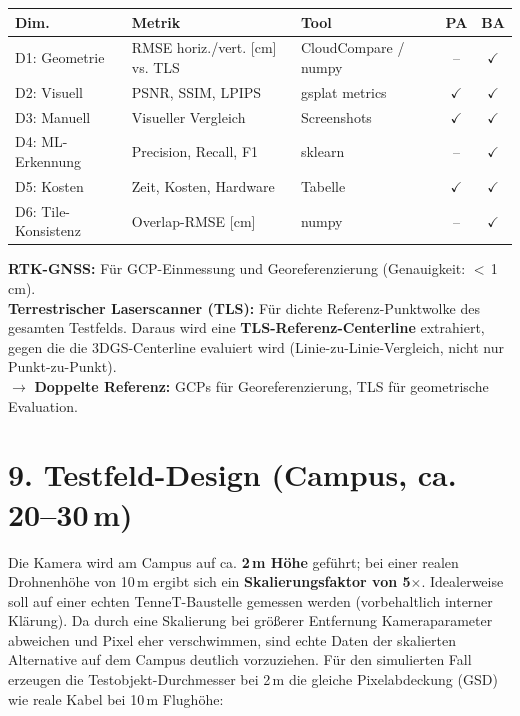 \documentclass[11pt, a4paper]{article}
\begin{document}
\begin{center}
\small
\begin{tabular}{|p{2cm}|p{4cm}|p{3cm}|c|c|}
\hline
\textbf{Dim.} & \textbf{Metrik} & \textbf{Tool} & \textbf{PA} & \textbf{BA} \\
\hline
D1: Geometrie & RMSE horiz./vert. [cm] vs. TLS & CloudCompare / numpy & -- & $\checkmark$ \\
\hline
D2: Visuell & PSNR, SSIM, LPIPS & gsplat metrics & $\checkmark$ & $\checkmark$ \\
\hline
D3: Manuell & Visueller Vergleich & Screenshots & $\checkmark$ & $\checkmark$ \\
\hline
D4: ML-Erkennung & Precision, Recall, F1 & sklearn & -- & $\checkmark$ \\
\hline
D5: Kosten & Zeit, Kosten, Hardware & Tabelle & $\checkmark$ & $\checkmark$ \\
\hline
D6: Tile-Konsistenz & Overlap-RMSE [cm] & numpy & -- & $\checkmark$ \\
\hline
\end{tabular}
\end{center}

\begin{tcolorbox}[colback=green!5, colframe=green!50!black, title=\textbf{Referenzdaten (verf\"ugbar an der Hochschule)}]
\textbf{RTK-GNSS:} F\"ur GCP-Einmessung und Georeferenzierung (Genauigkeit: $<$\,1\,cm).\\
\textbf{Terrestrischer Laserscanner (TLS):} F\"ur dichte Referenz-Punktwolke des gesamten Testfelds. Daraus wird eine \textbf{TLS-Referenz-Centerline} extrahiert, gegen die die 3DGS-Centerline evaluiert wird (Linie-zu-Linie-Vergleich, nicht nur Punkt-zu-Punkt).\\
$\rightarrow$ \textbf{Doppelte Referenz:} GCPs f\"ur Georeferenzierung, TLS f\"ur geometrische Evaluation.
\end{tcolorbox}

\section{9. Testfeld-Design (Campus, ca. 20--30\,m)}

Die Kamera wird am Campus auf ca. \textbf{2\,m H\"ohe} gef\"uhrt; bei einer realen Drohnenh\"ohe von 10\,m ergibt sich ein \textbf{Skalierungsfaktor von 5$\times$}. 
Idealerweise soll auf einer echten TenneT-Baustelle gemessen werden (vorbehaltlich interner Kl\"arung). Da durch eine Skalierung bei gr\"o\ss erer Entfernung Kameraparameter abweichen und Pixel eher verschwimmen, sind echte Daten der skalierten Alternative auf dem Campus deutlich vorzuziehen. F\"ur den simulierten Fall erzeugen die Testobjekt-Durchmesser bei 2\,m die gleiche Pixelabdeckung (GSD) wie reale Kabel bei 10\,m Flugh\"ohe:
\end{document}
